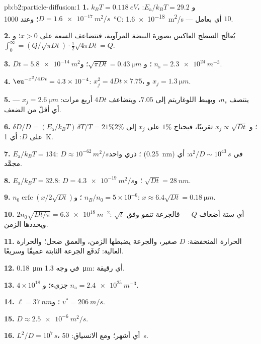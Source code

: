 \begin{solution}{pb:b2:particle-diffusion:1}
\textbf{1.} $k_BT = \qty{0.118}{eV}$، و $E_{\text{a}}/k_BT = 29.2$: $D =
\qty{1.6e-17}{m^2/s}$؛ وعند \qty{1000}{\celsius}: \qty{1.6e-18}{m^2/s} --- أي
بعامل $10$.

\textbf{2.} يُعالَج السطح العاكس بصورة النبضة المرآوية،
فتتضاعف السعة على $x > 0$؛ و $\int_0^\infty = (Q/\sqrt{\pi Dt})
\cdot \tfrac12\sqrt{4\pi Dt} = Q$.

\textbf{3.} $Dt = \qty{5.8e-14}{m^2}$؛ و $\sqrt{\pi Dt} = \qty{0.43}{\micro m}$؛ و $n_{\text{s}}
= \qty{2.3e24}{m^{-3}}$.

\textbf{4.} $\eu^{-x^2/4Dt} = 4.3 \times 10^{-4}$: $x_j^2 = 4Dt \times 7.75$، و $x_j =
\qty{1.3}{\micro m}$.

\textbf{5.} ينتصف $n_{\text{s}}$، ويهبط اللوغاريتم إلى $7.05$، ويتضاعف $4Dt$
أربع مرات: $x_j = \qty{2.6}{\micro m}$ --- أي أقلّ من الضعف.

\textbf{6.} $\delta D/D = (E_{\text{a}}/k_BT)\,\delta T/T = 21\%$؛ و $x_j \propto
\sqrt{Dt}$ تقريبًا، فيحتاج $1\%$ على $x_j$ إلى $2\%$ على $D$: أي \qty{1}{K}.

\textbf{7.} $E_{\text{a}}/k_BT = 134$: $D \approx 10^{-62}\,\unit{m^2/s}$؛ 
ذري واحد (\qty{0.25}{nm}) في $a^2/D \sim 10^{43}\,\unit{s}$: أي مجمَّد.

\textbf{8.} $E_{\text{a}}/k_BT = 32.8$: $D = \qty{4.3e-19}{m^2/s}$؛ و $\sqrt{Dt} =
\qty{28}{nm}$.

\textbf{9.} $n_0\operatorname{erfc}(x/2\sqrt{Dt})$؛ و $n_B/n_0 = 5 \times 10^{-6}$:
$x \approx 6.4\sqrt{Dt} = \qty{0.18}{\micro m}$.

\textbf{10.} $2n_0\sqrt{Dt/\pi} = \qty{6.3e18}{m^{-2}}$: أي ستة أضعاف $Q$ ---
فالجرعة تنمو وفق $\sqrt t$ ويحددها الزمن.

\textbf{11.} الحرارة المنخفضة: $D$ صغير، والجرعة يضبطها الزمن،
والعمق ضحل؛ والحرارة العالية: تُدفَع الجرعة الثابتة عميقًا وسريعًا.

\textbf{12.} \qty{0.18}{\micro m} في وجه \qty{1.3}{\micro m}: أي رقيقة.

\textbf{13.} $4 \times 10^{18}$ جزيء؛ و $n_{\text{a}} = \qty{2.4e25}{m^{-3}}$.

\textbf{14.} $\ell = \qty{37}{nm}$؛ و $v^* = \qty{206}{m/s}$.

\textbf{15.} $D \approx \qty{2.5e-6}{m^2/s}$.

\textbf{16.} $L^2/D = 10^7\,\unit{s}$، أي أشهر؛ ومع الانسياق: \qty{50}{s}.


\end{solution}
